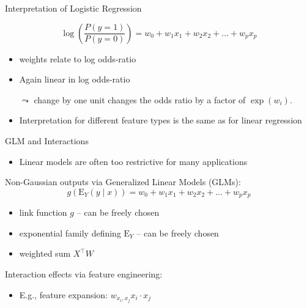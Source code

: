 \documentclass[11pt,compress,t,notes=noshow, xcolor=table]{beamer}
\begin{document}

\begin{vbframe}{Interpretation of Logistic Regression}

    $$\log \left(\frac{P(y = 1)}{P(y=0)}\right) = w_0 + w_1 x_1 + w_2 x_2 + \ldots + w_p x_p  $$

    \begin{itemize}
        \item weights relate to log odds-ratio
        \item Again linear in log odds-ratio
        \item[$\leadsto$] change by one unit changes the odds ratio by a \alert{factor} of $\exp(w_i)$.
        \medskip
        
        \item Interpretation for different feature types is the same as for linear regression
    \end{itemize}	

\end{vbframe}


\begin{vbframe}{GLM and Interactions}

    \begin{itemize}
        \item Linear models are often too restrictive for many applications
    \end{itemize}
    
    \medskip
    Non-Gaussian outputs via Generalized Linear Models (GLMs):
    $$g(\mathrm{E}_Y (y\mid x)) = w_0 + w_1 x_1 + w_2 x_2 + \ldots + w_p x_p$$
    \begin{itemize}
        \item link function $g$ -- can be freely chosen
        \item exponential family defining $\mathrm{E}_Y$ -- can be freely chosen
        \item weighted sum $X^\top W$
    \end{itemize}
    
    \medskip 
    
    Interaction effects via feature engineering:
    \begin{itemize}
        \item E.g., feature expansion: $w_{x_i,x_j} x_i \cdot x_j$
    \end{itemize}
    
\end{vbframe}
\end{document}
